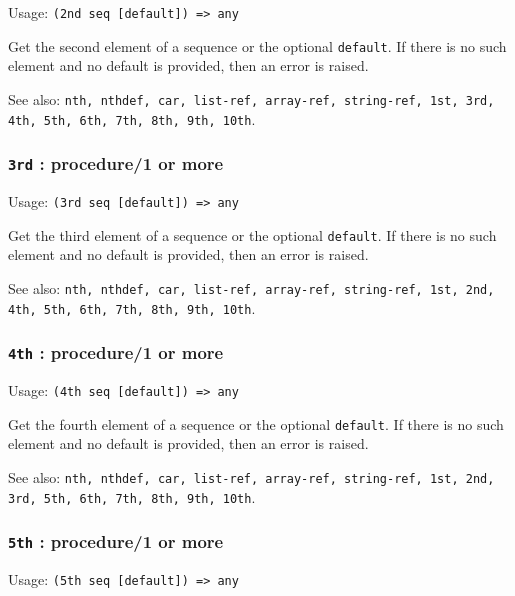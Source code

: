 \documentclass[
]{article}
\newcommand{\passthrough}[1]{#1}
\begin{document}
Usage: \passthrough{\lstinline!(2nd seq [default]) => any!}

Get the second element of a sequence or the optional
\passthrough{\lstinline!default!}. If there is no such element and no
default is provided, then an error is raised.

See also:
\passthrough{\lstinline!nth, nthdef, car, list-ref, array-ref, string-ref, 1st, 3rd, 4th, 5th, 6th, 7th, 8th, 9th, 10th!}.

\hypertarget{rd-procedure1-or-more}{%
\subsubsection{\texorpdfstring{\texttt{3rd} : procedure/1 or
more}{3rd : procedure/1 or more}}\label{rd-procedure1-or-more}}

Usage: \passthrough{\lstinline!(3rd seq [default]) => any!}

Get the third element of a sequence or the optional
\passthrough{\lstinline!default!}. If there is no such element and no
default is provided, then an error is raised.

See also:
\passthrough{\lstinline!nth, nthdef, car, list-ref, array-ref, string-ref, 1st, 2nd, 4th, 5th, 6th, 7th, 8th, 9th, 10th!}.

\hypertarget{th-procedure1-or-more-1}{%
\subsubsection{\texorpdfstring{\texttt{4th} : procedure/1 or
more}{4th : procedure/1 or more}}\label{th-procedure1-or-more-1}}

Usage: \passthrough{\lstinline!(4th seq [default]) => any!}

Get the fourth element of a sequence or the optional
\passthrough{\lstinline!default!}. If there is no such element and no
default is provided, then an error is raised.

See also:
\passthrough{\lstinline!nth, nthdef, car, list-ref, array-ref, string-ref, 1st, 2nd, 3rd, 5th, 6th, 7th, 8th, 9th, 10th!}.

\hypertarget{th-procedure1-or-more-2}{%
\subsubsection{\texorpdfstring{\texttt{5th} : procedure/1 or
more}{5th : procedure/1 or more}}\label{th-procedure1-or-more-2}}

Usage: \passthrough{\lstinline!(5th seq [default]) => any!}
\end{document}
